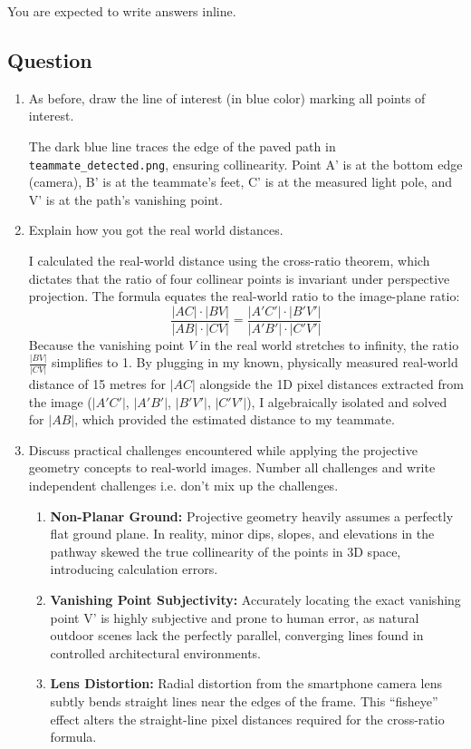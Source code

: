 You are expected to write answers inline.
\subsection{Question}
\begin{enumerate}

\item As before, draw the line of interest (in blue color) marking all points of interest.
\begin{studentSpace}
The dark blue line traces the edge of the paved path in \texttt{teammate\_detected.png}, ensuring collinearity. Point A' is at the bottom edge (camera), B' is at the teammate's feet, C' is at the measured light pole, and V' is at the path's vanishing point.
\end{studentSpace}
  
\item Explain how you got the real world distances.
\begin{studentSpace}
I calculated the real-world distance using the cross-ratio theorem, which dictates that the ratio of four collinear points is invariant under perspective projection. The formula equates the real-world ratio to the image-plane ratio:
\[
\frac{|AC| \cdot |BV|}{|AB| \cdot |CV|} = \frac{|A'C'| \cdot |B'V'|}{|A'B'| \cdot |C'V'|}
\]
Because the vanishing point $V$ in the real world stretches to infinity, the ratio $\frac{|BV|}{|CV|}$ simplifies to 1. By plugging in my known, physically measured real-world distance of 15 metres for $|AC|$ alongside the 1D pixel distances extracted from the image ($|A'C'|$, $|A'B'|$, $|B'V'|$, $|C'V'|$), I algebraically isolated and solved for $|AB|$, which provided the estimated distance to my teammate.
\end{studentSpace}

  
\item Discuss practical challenges encountered while applying the projective
geometry concepts to real-world images.
Number all challenges and write independent challenges i.e. don't mix up the challenges.
\begin{studentSpace}
\begin{enumerate}
    \item \textbf{Non-Planar Ground:} Projective geometry heavily assumes a perfectly flat ground plane. In reality, minor dips, slopes, and elevations in the pathway skewed the true collinearity of the points in 3D space, introducing calculation errors.
    \item \textbf{Vanishing Point Subjectivity:} Accurately locating the exact vanishing point V' is highly subjective and prone to human error, as natural outdoor scenes lack the perfectly parallel, converging lines found in controlled architectural environments.
    \item \textbf{Lens Distortion:} Radial distortion from the smartphone camera lens subtly bends straight lines near the edges of the frame. This ``fisheye'' effect alters the straight-line pixel distances required for the cross-ratio formula.
\end{enumerate}
\end{studentSpace}



\end{enumerate}
